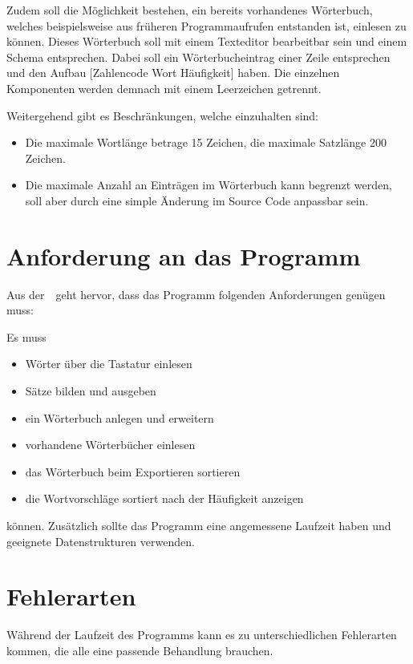 Zudem soll die Möglichkeit bestehen, ein bereits vorhandenes Wörterbuch, welches beispielsweise aus früheren Programmaufrufen entstanden ist, einlesen zu können.
Dieses Wörterbuch soll mit einem Texteditor bearbeitbar sein und einem Schema entsprechen.
Dabei soll ein Wörterbucheintrag einer Zeile entsprechen und den Aufbau [Zahlencode Wort Häufigkeit] haben.
Die einzelnen Komponenten werden demnach mit einem Leerzeichen getrennt.\\
\pagebreak

Weitergehend gibt es Beschränkungen, welche einzuhalten sind:
\begin{itemize}[noitemsep]
    \item Die maximale Wortlänge betrage 15 Zeichen, die maximale Satzlänge 200 Zeichen.
    \item Die maximale Anzahl an Einträgen im Wörterbuch kann begrenzt werden, soll aber durch eine simple Änderung im Source Code anpassbar sein.
\end{itemize}


\section{Anforderung an das Programm}\label{sec:anforderung-an-das-programm}
Aus der~~geht hervor, dass das Programm folgenden Anforderungen genügen muss:

Es muss
\begin{itemize}[noitemsep]
    \item Wörter über die Tastatur einlesen
    \item Sätze bilden und ausgeben
    \item ein Wörterbuch anlegen und erweitern
    \item vorhandene Wörterbücher einlesen
    \item das Wörterbuch beim Exportieren sortieren
    \item die Wortvorschläge sortiert nach der Häufigkeit anzeigen
\end{itemize}
können.
Zusätzlich sollte das Programm eine angemessene Laufzeit haben und geeignete Datenstrukturen verwenden.

\section{Fehlerarten}\label{sec:fehlerarten}

Während der Laufzeit des Programms kann es zu unterschiedlichen Fehlerarten kommen, die alle eine passende Behandlung brauchen.

